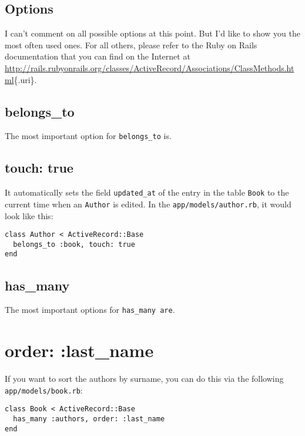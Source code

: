 \documentclass[a4paper]{book}
\newcounter{tab}[chapter]
\begin{document}
\subsection{Options}\label{options}

I can't comment on all possible options at this point. But I'd like to show you the most often used ones. For all others, please refer to the Ruby on Rails documentation that you can find on the Internet at \url{http://rails.rubyonrails.org/classes/ActiveRecord/Associations/ClassMethods.html}\{.uri\}.

\subsection{belongs\_to}\label{belongsux5fto}

The most important option for \texttt{belongs\_to} is.

\subsection{touch: true}\label{touch-true}

It automatically sets the field \texttt{updated\_at} of the entry in the table \texttt{Book} to the current time when an \texttt{Author} is edited. In the \texttt{app/models/author.rb}, it would look like this:

\begin{shaded}\begin{verbatim}
class Author < ActiveRecord::Base
  belongs_to :book, touch: true
end
\end{verbatim}\end{shaded}

\subsection{has\_many}\label{hasux5fmany}

The most important options for \texttt{has\_many are}.

\section{order: :last\_name}\label{order-lastux5fname}

If you want to sort the authors by surname, you can do this via the following \texttt{app/models/book.rb}:

\begin{shaded}\begin{verbatim}
class Book < ActiveRecord::Base
  has_many :authors, order: :last_name
end
\end{verbatim}\end{shaded}
\end{document}
